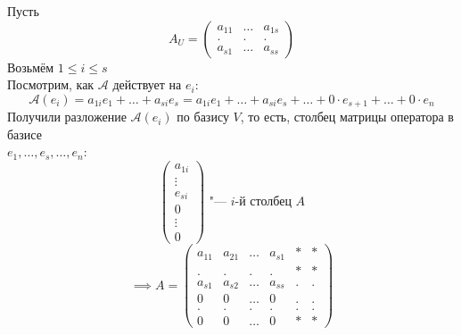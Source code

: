 \begin{eproof}
	\item Пусть
	$$ A_U =
	\begin{pmatrix}
		a_{11} & \dots & a_{1s} \\
		. & . & . \\
		a_{s1} & \dots & a_{ss}
	\end{pmatrix} $$
	Возьмём $ 1 \le i \le s $ \\
	Посмотрим, как $ \mathcal{A} $ действует на $ e_i $:
	$$ \mathcal{A}(e_i) = a_{1i}e_1 + \dots + a_{si}e_s = a_{1i}e_1 + \dots + a_{si}e_s + \dots + 0 \cdot e_{s + 1} + \dots + 0 \cdot e_n $$
	Получили разложение $ \mathcal{A}(e_i) $ по базису $ V $, то есть, столбец матрицы оператора в базисе \\
	$ e_1, \dots, e_s, \dots, e_n $:
	$$
	\begin{pmatrix}
		a_{1i} \\
		\vdots \\
		e_{si} \\
		0 \\
		\vdots \\
		0
	\end{pmatrix} \text{ "--- } i \text{-й столбец } A $$
	$$ \implies A =
	\begin{pmatrix}
		a_{11} & a_{21} & \dots & a_{s1} & * & * \\
		. & . & . & . & * & * \\
		a_{s1} & a_{s2} & \dots & a_{ss} & . & . \\
		0 & 0 & \dots & 0 & . & . \\
		. & . & . & . & . & . \\
		0 & 0 & \dots & 0 & * & *
	\end{pmatrix} $$


\end{eproof}
